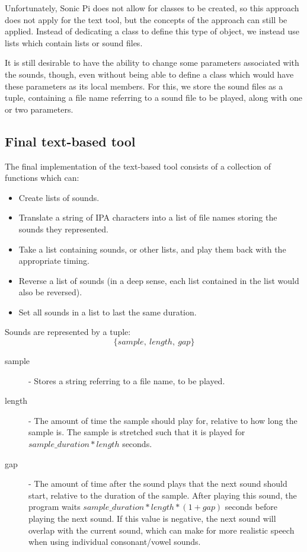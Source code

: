 \documentclass[12pt,a4paper,oneside,openright]{report}
\begin{document}
Unfortunately, Sonic Pi does not allow for classes to be created, so this approach does not apply for the text tool, but the concepts of the approach can still be applied. Instead of dedicating a class to define this type of object, we instead use lists which contain lists or sound files.

It is still desirable to have the ability to change some parameters associated with the sounds, though, even without being able to define a class which would have these parameters as its local members. For this, we store the sound files as a tuple, containing a file name referring to a sound file to be played, along with one or two parameters.

\subsection{Final text-based tool}
The final implementation of the text-based tool consists of a collection of functions which can:
\begin{itemize}
    \item Create lists of sounds.
    \item Translate a string of IPA characters into a list of file names storing the sounds they represented.
    \item Take a list containing sounds, or other lists, and play them back with the appropriate timing.
    \item Reverse a list of sounds (in a deep sense, each list contained in the list would also be reversed).
    \item Set all sounds in a list to last the same duration.
\end{itemize}

Sounds are represented by a tuple:
\begin{equation*}
    \{sample,\ length,\ gap\}
\end{equation*}

\begin{description}
    \item[sample] - Stores a string referring to a file name, to be played.

    \item[length] - The amount of time the sample should play for, relative to how long the sample is. The sample is stretched such that it is played for $sample\_duration * length$ seconds.

    \item[gap] - The amount of time after the sound plays that the next sound should start, relative to the duration of the sample. After playing this sound, the program waits $sample\_duration * length * (1 + gap)$ seconds before playing the next sound. If this value is negative, the next sound will overlap with the current sound, which can make for more realistic speech when using individual consonant/vowel sounds.
\end{description}
\newpage
\end{document}
